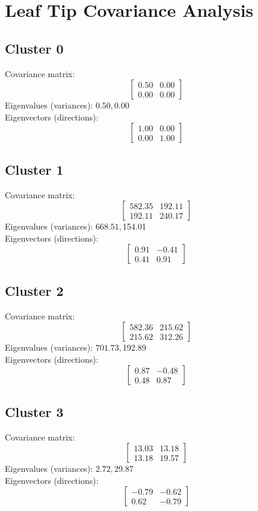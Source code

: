 \documentclass{article}
\begin{document}
\section*{Leaf Tip Covariance Analysis}
\subsection*{Cluster 0}
Covariance matrix:
\[\begin{bmatrix}0.50 & 0.00 \\0.00 & 0.00\end{bmatrix}\]
Eigenvalues (variances): $ 0.50, $0.00\\
Eigenvectors (directions):
\[\begin{bmatrix}1.00 & 0.00 \\0.00 & 1.00\end{bmatrix}\]
\subsection*{Cluster 1}
Covariance matrix:
\[\begin{bmatrix}582.35 & 192.11 \\192.11 & 240.17\end{bmatrix}\]
Eigenvalues (variances): $ 668.51, $154.01\\
Eigenvectors (directions):
\[\begin{bmatrix}0.91 & -0.41 \\0.41 & 0.91\end{bmatrix}\]
\subsection*{Cluster 2}
Covariance matrix:
\[\begin{bmatrix}582.36 & 215.62 \\215.62 & 312.26\end{bmatrix}\]
Eigenvalues (variances): $ 701.73, $192.89\\
Eigenvectors (directions):
\[\begin{bmatrix}0.87 & -0.48 \\0.48 & 0.87\end{bmatrix}\]
\subsection*{Cluster 3}
Covariance matrix:
\[\begin{bmatrix}13.03 & 13.18 \\13.18 & 19.57\end{bmatrix}\]
Eigenvalues (variances): $ 2.72, $29.87\\
Eigenvectors (directions):
\[\begin{bmatrix}-0.79 & -0.62 \\0.62 & -0.79\end{bmatrix}\]
\end{document}

